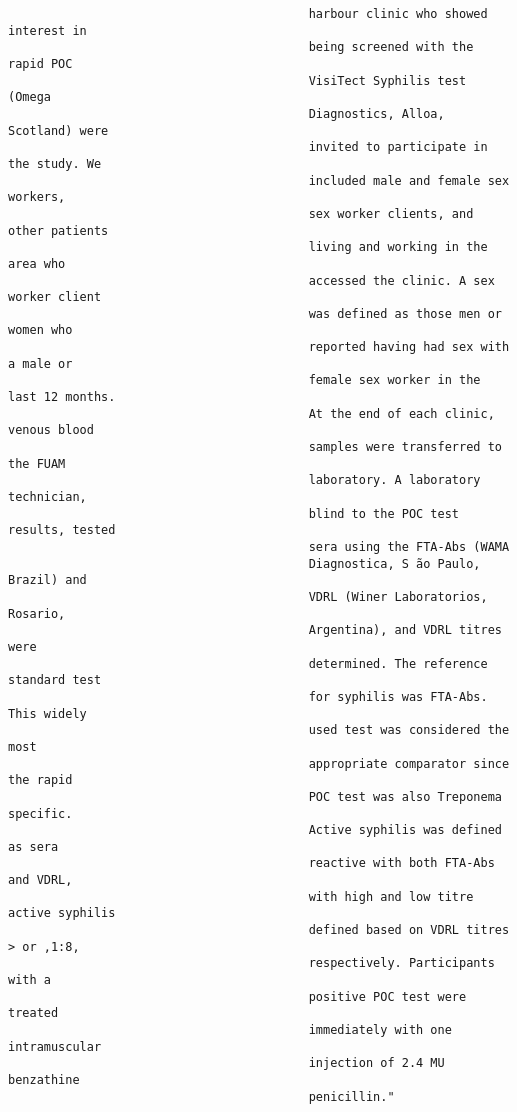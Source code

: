 \documentclass{article}
\begin{document}
\begin{verbatim}
                                          harbour clinic who showed interest in
                                          being screened with the rapid POC
                                          VisiTect Syphilis test (Omega
                                          Diagnostics, Alloa, Scotland) were
                                          invited to participate in the study. We
                                          included male and female sex workers,
                                          sex worker clients, and other patients
                                          living and working in the area who
                                          accessed the clinic. A sex worker client
                                          was defined as those men or women who
                                          reported having had sex with a male or
                                          female sex worker in the last 12 months.
                                          At the end of each clinic, venous blood
                                          samples were transferred to the FUAM
                                          laboratory. A laboratory technician,
                                          blind to the POC test results, tested
                                          sera using the FTA-Abs (WAMA
                                          Diagnostica, S ̃ao Paulo, Brazil) and
                                          VDRL (Winer Laboratorios, Rosario,
                                          Argentina), and VDRL titres were
                                          determined. The reference standard test
                                          for syphilis was FTA-Abs. This widely
                                          used test was considered the most
                                          appropriate comparator since the rapid
                                          POC test was also Treponema specific.
                                          Active syphilis was defined as sera
                                          reactive with both FTA-Abs and VDRL,
                                          with high and low titre active syphilis
                                          defined based on VDRL titres > or ,1:8,
                                          respectively. Participants with a
                                          positive POC test were treated
                                          immediately with one intramuscular
                                          injection of 2.4 MU benzathine
                                          penicillin."

\end{verbatim}
\end{document}
